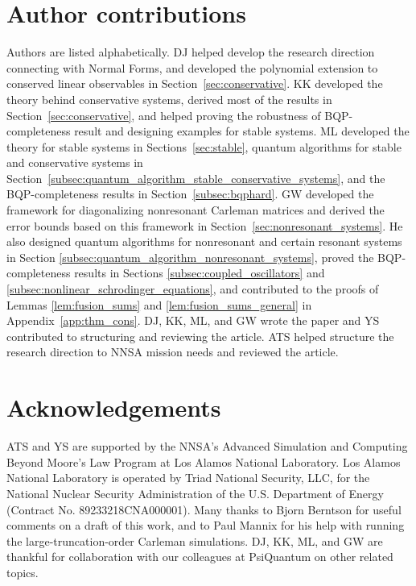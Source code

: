 \documentclass[superscriptaddress,onecolumn,nofootinbib,longbibliography,a4paper,accepted=2026-09-29]{quantumarticle}
\theoremstyle{plain}
\theoremstyle{definition}
\numberwithin{thm}{section}
\numberwithin{assumption}{section}
\numberwithin{lemma}{section}
\numberwithin{prop}{section}
\numberwithin{cor}{section}
\numberwithin{definition}{section}
\numberwithin{rmk}{section}
\numberwithin{equation}{section}
\begin{document}
\section{Author contributions} 
Authors are listed alphabetically. DJ helped develop the research direction connecting with Normal Forms, and developed the polynomial extension to conserved linear observables in Section~\ref{sec:conservative}. KK developed the theory behind conservative systems, derived most of the results in Section~\ref{sec:conservative}, and helped proving the robustness of BQP-completeness result and designing examples for stable systems. ML developed the theory for stable systems in Sections~\ref{sec:stable}, quantum algorithms for stable and conservative systems in Section~\ref{subsec:quantum_algorithm_stable_conservative_systems}, and the BQP-completeness results in Section~\ref{subsec:bqphard}. GW developed the framework for diagonalizing nonresonant Carleman matrices and derived the error bounds based on this framework in Section~\ref{sec:nonresonant_systems}. He also designed quantum algorithms for nonresonant and certain resonant systems in Section \ref{subsec:quantum_algorithm_nonresonant_systems}, proved the BQP-completeness results in Sections \ref{subsec:coupled_oscillators} and \ref{subsec:nonlinear_schrodinger_equations}, and contributed to the proofs of Lemmas \ref{lem:fusion_sums} and \ref{lem:fusion_sums_general} in Appendix~\ref{app:thm_cons}. DJ, KK, ML, and GW wrote the paper and YS contributed to structuring and reviewing the article. ATS helped structure the research direction to NNSA mission needs and reviewed the article.

\section{Acknowledgements} 
ATS and YS are supported by the NNSA’s Advanced
Simulation and Computing Beyond Moore’s Law Program at Los
Alamos National Laboratory. Los Alamos
National Laboratory is operated by Triad National Security, LLC, for
the National Nuclear Security Administration of the U.S.
Department of Energy (Contract No. 89233218CNA000001). Many thanks to Bjorn Berntson for useful comments on a draft of this work, and to Paul Mannix for his help with running the large-truncation-order Carleman simulations. DJ, KK, ML, and GW are thankful for collaboration with our colleagues at PsiQuantum on other related topics.

\newpage
\appendix

\end{document}
